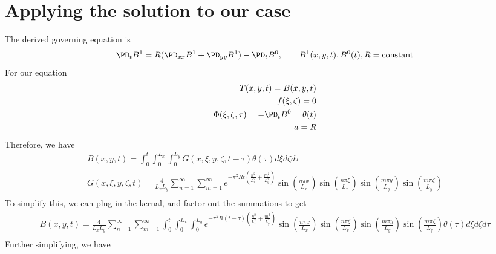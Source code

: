 \documentclass[11pt]{article}
\begin{document}
\section{Applying the solution to our case}
The derived governing equation is
\begin{equation}\begin{aligned}
\PD_t B^1 = R (\PD_{xx} B^1 + \PD_{yy} B^1) - \PD_t B^0, \qquad B^1(x,y,t),B^0(t),R=\text{constant} \\
\end{aligned} \end{equation}
For our equation
\begin{equation}\begin{aligned}
T(x,y,t) = B(x,y,t) \\
f(\xi,\zeta) = 0 \\
\Phi(\xi,\zeta,\tau) = - \PD_t B^0 = \theta(t) \\
a = R \\
\end{aligned} \end{equation}
Therefore, we have
\begin{equation}\begin{aligned}
B(x,y,t) = \int_0^t \int_0^{L_x} \int_0^{L_y} G(x,\xi,y,\zeta,t-\tau) \theta(\tau) d \xi d \zeta d \tau \\
G(x,\xi,y,\zeta,t) =
\frac{4}{L_x L_y} \sum_{n=1}^{\infty} \sum_{m=1}^{\infty}
e^{-\pi^2 R t \left( \frac{n^2}{L_x^2} + \frac{m^2}{L_y^2} \right)}
\sin \left( \frac{n \pi x}{L_x} \right)
\sin \left( \frac{n \pi \xi}{L_x} \right)
\sin \left( \frac{m \pi y}{L_y} \right)
\sin \left( \frac{m \pi \zeta}{L_y} \right)
\\
\end{aligned} \end{equation}
To simplify this, we can plug in the kernal, and factor out the summations to get
\tiny\begin{equation}\begin{aligned}
B(x,y,t) = \frac{4}{L_x L_y} \sum_{n=1}^{\infty} \sum_{m=1}^{\infty} \int_0^t \int_0^{L_x} \int_0^{L_y}
e^{-\pi^2 R (t-\tau) \left( \frac{n^2}{L_x^2} + \frac{m^2}{L_y^2} \right)}
\sin \left( \frac{n \pi x}{L_x} \right)
\sin \left( \frac{n \pi \xi}{L_x} \right)
\sin \left( \frac{m \pi y}{L_y} \right)
\sin \left( \frac{m \pi \zeta}{L_y} \right)
 \theta(\tau) d \xi d \zeta d \tau \\
\end{aligned} \end{equation}
Further simplifying, we have
\end{document}

